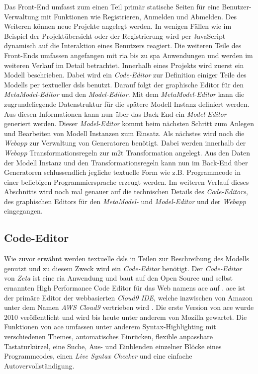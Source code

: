 Das Front-End umfasst zum einen Teil primär statische Seiten für eine Benutzer-Verwaltung mit Funktionen wie Registrieren, Anmelden und Abmelden. Des Weiteren können neue Projekte angelegt werden. In wenigen Fällen wie im  Beispiel der Projektübersicht oder der Registrierung wird per JavaScript dynamisch auf die Interaktion eines Benutzers reagiert. Die weiteren Teile des Front-Ends umfassen angefangen mit \ac{ria} bis zu \ac{spa} Anwendungen und werden im weiteren Verlauf im Detail betrachtet. Innerhalb eines Projekts wird zuerst ein Modell beschrieben. Dabei wird ein \textit{Code-Editor} zur Definition einiger Teile des Modells per textueller \acp{dsl} benutzt. Darauf folgt der graphische Editor für den \textit{MetaModel-Editor} und den \textit{Model-Editor}. Mit dem \textit{MetaModel-Editor} kann die zugrundeliegende Datenstruktur für die spätere Modell Instanz definiert werden. Aus diesen Informationen kann nun über das Back-End ein \textit{Model-Editor} generiert werden. Dieser \textit{Model-Editor} kommt beim nächsten Schritt zum Anlegen und Bearbeiten von Modell Instanzen zum Einsatz. Als nächstes wird noch die \textit{Webapp} zur Verwaltung von Generatoren benötigt. Dabei werden innerhalb der \textit{Webapp} Transformationsregeln zur \ac{m2t} Transformation angelegt. Aus den Daten der Modell Instanz und den Transformationsregeln kann nun im Back-End über Generatoren schlussendlich jegliche textuelle Form wie z.B. Programmcode in einer beliebigen Programmiersprache erzeugt werden. Im weiteren Verlauf dieses Abschnitts wird noch mal genauer auf die technischen Details des \textit{Code-Editors}, des graphischen Editors für den \textit{MetaModel-} und \textit{Model-Editor} und der \textit{Webapp} eingegangen.

\subsection{Code-Editor}

Wie zuvor erwähnt werden textuelle \acp{dsl} in Teilen zur Beschreibung des Modells genutzt und zu diesem Zweck wird ein \textit{Code-Editor} benötigt. Der \textit{Code-Editor} von \textit{Zeta} ist eine \ac{ria} Anwendung und baut auf den Open Source und selbst ernannten High Performance Code Editor für das Web namens \ac{ace} auf \cite{zeta_ace_html} \cite{zeta_ace_scala}. \ac{ace} ist der primäre Editor der webbasierten \textit{Cloud9 IDE}, welche inzwischen von Amazon unter dem Namen \textit{AWS Cloud9} vertrieben wird \cite{ace_about} \cite{ace_aws}. Die erste Version von \ac{ace} wurde 2010 veröffentlicht und wird bis heute unter anderem von Mozilla gewartet. Die Funktionen von \ac{ace} umfassen unter anderem Syntax-Highlighting mit verschiedenen Themes, automatisches Einrücken, flexible anpassbare Tastaturkürzel, eine Suche, Aus- und Einblenden einzelner Blöcke eines Programmcodes, einen \textit{Live Syntax Checker} und eine einfache Autovervollständigung.

